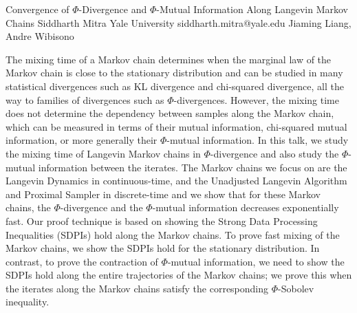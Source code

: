 \begin{talk}
  {Convergence of $\Phi$-Divergence and $\Phi$-Mutual Information Along Langevin Markov Chains}%
  {Siddharth Mitra}%
  {Yale University}%
  {siddharth.mitra@yale.edu}%
  {Jiaming Liang, Andre Wibisono}%
  
    
   
The mixing time of a Markov chain determines when the marginal law of the Markov chain is close to the stationary distribution and can be studied in many statistical divergences such as KL divergence and chi-squared divergence, all the way to families of divergences such as $\Phi$-divergences. However, the mixing time does not determine the dependency between samples along the Markov chain, which can be measured in terms of their mutual information, chi-squared mutual information, or more generally their $\Phi$-mutual information. In this talk, we study the mixing time of Langevin Markov chains in $\Phi$-divergence and also study the $\Phi$-mutual information between the iterates. The Markov chains we focus on are the Langevin Dynamics in continuous-time, and the Unadjusted Langevin Algorithm and Proximal Sampler in discrete-time and we show that for these Markov chains, the $\Phi$-divergence and the $\Phi$-mutual information decreases exponentially fast. Our proof technique is based on showing the Strong Data Processing Inequalities (SDPIs) hold along the Markov chains. To prove fast mixing of the Markov chains, we show the SDPIs hold for the stationary distribution. In contrast, to prove the contraction of $\Phi$-mutual information, we need to show the SDPIs hold along the entire trajectories of the Markov chains; we prove this when the iterates along the Markov chains satisfy the corresponding $\Phi$-Sobolev inequality.


\medskip


\end{talk}
